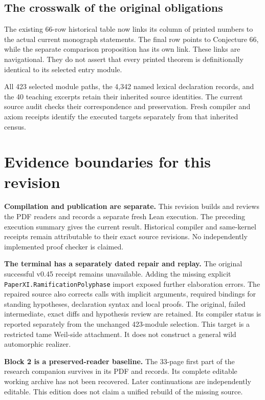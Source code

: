 \subsection*{The crosswalk of the original obligations}
The existing 66-row historical table now links its column of printed numbers to the actual current monograph statements. The final row points to Conjecture 66, while the separate comparison proposition has its own link. These links are navigational. They do not assert that every printed theorem is definitionally identical to its selected entry module.

All 423 selected module paths, the 4,342 named lexical declaration records, and the 40 teaching excerpts retain their inherited source identities. The current source audit checks their correspondence and preservation. Fresh compiler and axiom receipts identify the executed targets separately from that inherited census.
\clearpage
\section*{Evidence boundaries for this revision}
{}
\textbf{Compilation and publication are separate.} This revision builds and reviews the PDF readers and records a separate fresh Lean execution. The preceding execution summary gives the current result. Historical compiler and same-kernel receipts remain attributable to their exact source revisions. No independently implemented proof checker is claimed.

\textbf{The terminal has a separately dated repair and replay.} The original successful v0.45 receipt remains unavailable. Adding the missing explicit \nolinkurl{PaperXI.RamificationPolyphase} import exposed further elaboration errors. The repaired source also corrects calls with implicit arguments, required bindings for standing hypotheses, declaration syntax and local proofs. The original, failed intermediate, exact diffs and hypothesis review are retained. Its compiler status is reported separately from the unchanged 423-module selection. This target is a restricted tame Weil-side attachment. It does not construct a general wild automorphic realizer.

\textbf{Block 2 is a preserved-reader baseline.} The 33-page first part of the research companion survives in its PDF and records. Its complete editable working archive has not been recovered. Later continuations are independently editable. This edition does not claim a unified rebuild of the missing source.

